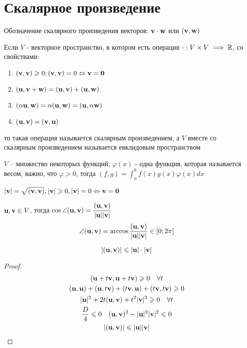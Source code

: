 \documentclass[main]{subfiles}
\begin{document}
\chapter{Скалярное произведение}
Обозначение скалярного произведения векторов: $\mathbf{v} \cdot \mathbf{w}$ или $(\mathbf{v}, \mathbf{w})$

\begin{definition}
    Если $V$ - векторное пространство, в котором есть операция $\cdot : V \times V
        \implies \mathbb{R}$, со свойствами:
    \begin{enumerate}
        \item $(\mathbf{v}, \mathbf{v}) \geqslant0; (\mathbf{v}, \mathbf{v}) = 0 \Leftrightarrow \mathbf{v} = \mathbf{0}$
        \item $(\mathbf{u}, \mathbf{v}+ \mathbf{w}) = (\mathbf{u},\mathbf{v})+ (\mathbf{u},\mathbf{w})$
        \item $(\alpha\mathbf{u}, \mathbf{w}) = \alpha(\mathbf{u}, \mathbf{w}) = (\mathbf{u}, \alpha \mathbf{w})$
        \item $(\mathbf{u},\mathbf{v}) = (\mathbf{v},\mathbf{u})$
    \end{enumerate}
    то такая операция называется скалярным произведением, а $V$ вместе
    со скалярным произведением называется евклидовым пространством
\end{definition}

\begin{example}
    $V$ -- множество некоторых функций, $\varphi(x)$ - одна функция, которая
    называется весом, важно, что $\varphi >0$, тогда $(f,g) = \int_a^b f(x)g(x)\varphi(x)dx$
\end{example}

\begin{definition}
    $|\mathbf{v}| = \sqrt{(\mathbf{v}, \mathbf{v})}, |\mathbf{v}| \geqslant 0, |\mathbf{v}| = 0 \Leftrightarrow \mathbf{v} = \mathbf{0}$
\end{definition}
\begin{definition}
    $\mathbf{u}, \mathbf{v} \in V$, тогда
    $\displaystyle \cos \angle (\mathbf{u}, \mathbf{v}) = \frac{(\mathbf{u},\mathbf{v})}{|\mathbf{u}||\mathbf{v}|}$
    \[\angle(\mathbf{u}, \mathbf{v}) = \arccos \frac{(\mathbf{u},\mathbf{v})}{|\mathbf{u}||\mathbf{v}|} \in [0; 2\pi]\]
\end{definition}

\begin{theorem}
    \[|(\mathbf{u},\mathbf{v})| \leqslant |\mathbf{u}| \cdot |\mathbf{v}|\]
\end{theorem}
\begin{proof}
    \begin{gather*}
        (\mathbf{u} + t \mathbf{v}, \mathbf{u}+t \mathbf{v}) \geqslant 0 \quad \forall t\\
        (\mathbf{u}, \mathbf{u}) + (\mathbf{u},t \mathbf{v})+(t \mathbf{v}, \mathbf{u}) + (t \mathbf{v}, t \mathbf{v}) \geqslant 0\\
        |\mathbf{u}|^2 + 2t(\mathbf{u},\mathbf{v}) + t^2 |\mathbf{v}|^2 \geqslant 0 \quad \forall t\\
        \frac{D}{4} \leqslant 0 \quad (\mathbf{u},\mathbf{v})^2 - |\mathbf{u}|^2 |\mathbf{v}|^2 \leqslant 0\\
        |(\mathbf{u},\mathbf{v})| \leqslant |\mathbf{u}| |\mathbf{v}|
    \end{gather*}
\end{proof}
\end{document}
